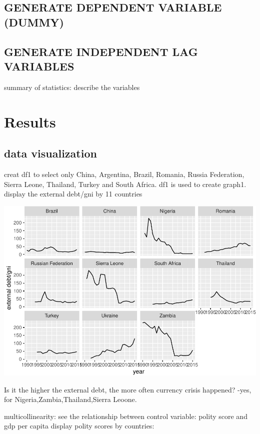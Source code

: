 \documentclass[12pt,]{article}
\begin{document}
\subsection{GENERATE DEPENDENT VARIABLE
(DUMMY)}\label{generate-dependent-variable-dummy}

\subsection{GENERATE INDEPENDENT LAG
VARIABLES}\label{generate-independent-lag-variables}

summary of statistics: describe the variables

\section{Results}\label{results}

\subsection{data visualization}\label{data-visualization-1}

creat df1 to select only China, Argentina, Brazil, Romania, Russia
Federation, Sierra Leone, Thailand, Turkey and South Africa. df1 is used
to create graph1. display the external debt/gni by 11 countries

\includegraphics{Final_Work_Knit_files/figure-latex/unnamed-chunk-36-1.pdf}

Is it the higher the external debt, the more often currency crisis
happened? -yes, for Nigeria,Zambia,Thailand,Sierra Leoone.

multicollinearity: see the relationship between control variable: polity
score and gdp per capita display polity scores by countries:
\end{document}
